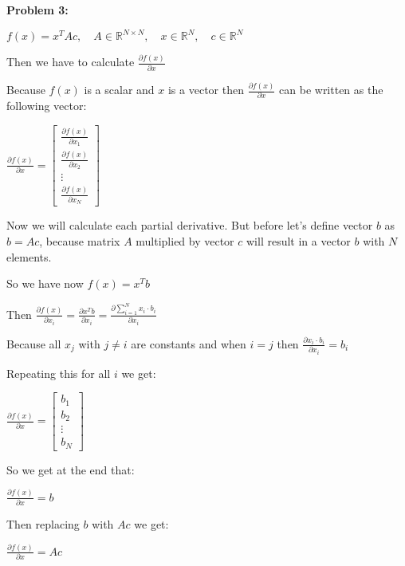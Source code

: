 \textbf{Problem 3:}

\singlespacing

$f(x) = x^TAc,\quad A \in \mathbb{R}^{N\times N},\quad x \in \mathbb{R}^N, \quad c \in \mathbb{R}^N$

\singlespacing

Then we have to calculate $\frac{\partial f(x)}{\partial x}$

\singlespacing

Because $f(x)$ is a scalar and $x$ is a vector then $\frac{\partial f(x)}{\partial x}$
can be written as the following vector:

\singlespacing

{
    \renewcommand{\arraystretch}{1.8}
    $\frac{\partial f(x)}{\partial x} = \begin{bmatrix}
            \frac{\partial f(x)}{\partial x_1} \\
            \frac{\partial f(x)}{\partial x_2} \\
            \vdots                             \\
            \frac{\partial f(x)}{\partial x_N}
        \end{bmatrix}$
}

\singlespacing

Now we will calculate each partial derivative. But before
let's define vector $b$ as $b = Ac$, because matrix $A$ multiplied
by vector $c$ will result in a vector $b$ with $N$ elements.

\singlespacing

So we have now $f(x) = x^Tb$

\singlespacing

Then $\frac{\partial f(x)}{\partial x_i} = \frac{\partial x^Tb}{\partial x_i} = \frac{\partial \sum_{i=1}^{N}x_i\cdot b_i}{\partial x_i}$

\singlespacing

Because all $x_j$ with $j \neq i$ are constants and when
$i = j$ then $\frac{\partial x_i\cdot b_i}{\partial x_i} = b_i$

\singlespacing

Repeating this for all $i$ we get:

\singlespacing

{
    \renewcommand{\arraystretch}{1.8}
    $\frac{\partial f(x)}{\partial x} = \begin{bmatrix}
            b_1    \\
            b_2    \\
            \vdots \\
            b_N
        \end{bmatrix}$
}

\singlespacing

So we get at the end that:

\singlespacing


$\frac{\partial f(x)}{\partial x} = b$

\singlespacing

Then replacing $b$ with $Ac$ we get:

\singlespacing

$\frac{\partial f(x)}{\partial x} = Ac$


